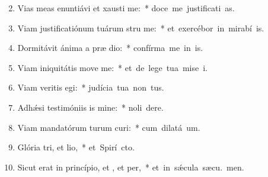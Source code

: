 \begin{flushleft}
\begin{enumerate}[leftmargin=*]
\setcounter{enumi}{1}

\item Vias meas enuntiávi et xausti me:~* \mbox{doce me justificati as.}
\item Viam justificatiónum tuárum stru me:~* \mbox{et exercébor in mirabí is.}
\item Dormitávit ánima a præ dio:~* \mbox{confírma me in  is.}
\item Viam iniquitátis move  me:~* \mbox{et de lege tua mise i.}
\item Viam veritis egi:~* \mbox{judícia tua non  tus.}
\item Adh\'{\ae}si testimóniis is mine:~* \mbox{noli  dere.}
\item Viam mandatórum turum curi:~* \mbox{cum dilatá  um.}
\item Glória tri, et lio,~* \mbox{et Spirí cto.}
\item Sicut erat in princípio, et , et per,~* \mbox{et in s\'{\ae}cula sæcu. men.}


\end{enumerate}
\end{flushleft}

